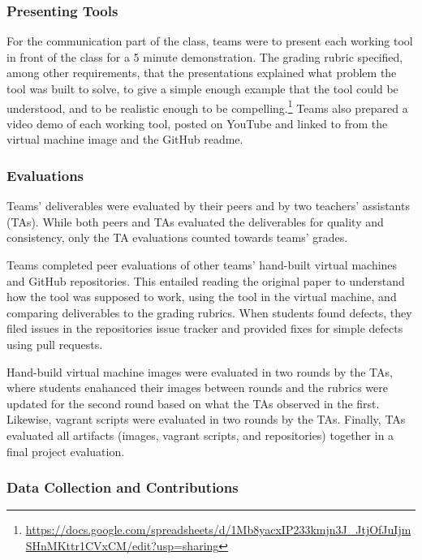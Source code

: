 \documentclass[10pt,conference]{IEEEtran}
\begin{document}
\subsubsection{Presenting Tools}

For the communication part of the class,
teams were to present each working tool in front of the class
for a 5 minute demonstration.
The grading rubric specified, among other requirements,
that the presentations explained what problem the 
tool was built to solve, to give a simple enough
example that the tool could be understood,
and to be realistic enough to be 
compelling.\footnote{\url{https://docs.google.com/spreadsheets/d/1Mb8yacxIP233kmjn3J_JtjOfJuIjmSHnMKttr1CVxCM/edit?usp=sharing}}
Teams also prepared a video demo of each working tool,
posted on YouTube and linked to from the virtual machine
image and the GitHub readme.

\subsubsection{Evaluations}

Teams' deliverables were evaluated by their 
peers and by two teachers' assistants (TAs).
While both peers and TAs evaluated the deliverables
for quality and consistency, only the TA evaluations
counted towards teams' grades.

Teams completed peer evaluations of other teams' hand-built 
virtual machines and GitHub repositories.
This entailed reading the original paper to understand
how the tool was supposed to work, 
using the tool in the virtual machine,
and comparing deliverables to the grading rubrics.
When students found defects, they filed issues 
in the repositories issue tracker and provided
fixes for simple defects using pull requests.


Hand-build virtual machine images were evaluated in 
two rounds by the TAs, where students enahanced their
images between rounds and the rubrics were updated
for the second round based on what the TAs 
observed in the first.
Likewise, vagrant scripts were evaluated in two rounds
by the TAs.
Finally, TAs evaluated all artifacts (images, vagrant 
scripts, and repositories) together in a final project 
evaluation.

\subsubsection{Data Collection and Contributions}
\end{document}
